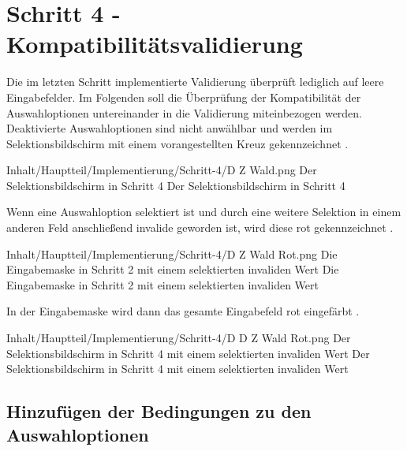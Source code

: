 \chapter{Schritt 4 - Kompatibilitätsvalidierung }
\label{chap:Schritt-4}

Die im letzten Schritt implementierte Validierung überprüft lediglich auf leere Eingabefelder.
Im Folgenden soll die Überprüfung der Kompatibilität der Auswahloptionen untereinander in die Validierung miteinbezogen werden.
Deaktivierte Auswahloptionen sind nicht anwählbar und werden im Selektionsbildschirm mit einem vorangestellten Kreuz gekennzeichnet \Abb{\ref{fig:Schritt4EingabemaskeDZWald}}.

\begin{alexfigure}{Inhalt/Hauptteil/Implementierung/Schritt-4/D Z Wald.png}
  {Der Selektionsbildschirm in Schritt 4}
  {Der Selektionsbildschirm in Schritt 4}

  \label{fig:Schritt4EingabemaskeDZWald}

\end{alexfigure}

Wenn eine Auswahloption selektiert ist und durch eine weitere Selektion in einem anderen Feld anschließend invalide geworden ist,
wird diese rot gekennzeichnet \Abb{\ref{fig:Schritt4EingabemaskeDZWaldRot}}.

\begin{alexfigure}{Inhalt/Hauptteil/Implementierung/Schritt-4/D Z Wald Rot.png}
  {Die Eingabemaske in Schritt 2 mit einem selektierten invaliden Wert}
  {Die Eingabemaske in Schritt 2 mit einem selektierten invaliden Wert}

  \label{fig:Schritt4EingabemaskeDZWaldRot}

\end{alexfigure}

\clearpage
In der Eingabemaske wird dann das gesamte Eingabefeld rot eingefärbt \Abb{\ref{fig:Schritt4EingabemaskeDDZWaldRot}}.

\begin{alexfigure}{Inhalt/Hauptteil/Implementierung/Schritt-4/D D Z Wald Rot.png}
  {Der Selektionsbildschirm in Schritt 4 mit einem selektierten invaliden Wert}
  {Der Selektionsbildschirm in Schritt 4 mit einem selektierten invaliden Wert}

  \label{fig:Schritt4EingabemaskeDDZWaldRot}

\end{alexfigure}

\section{Hinzufügen der Bedingungen zu den Auswahloptionen}

